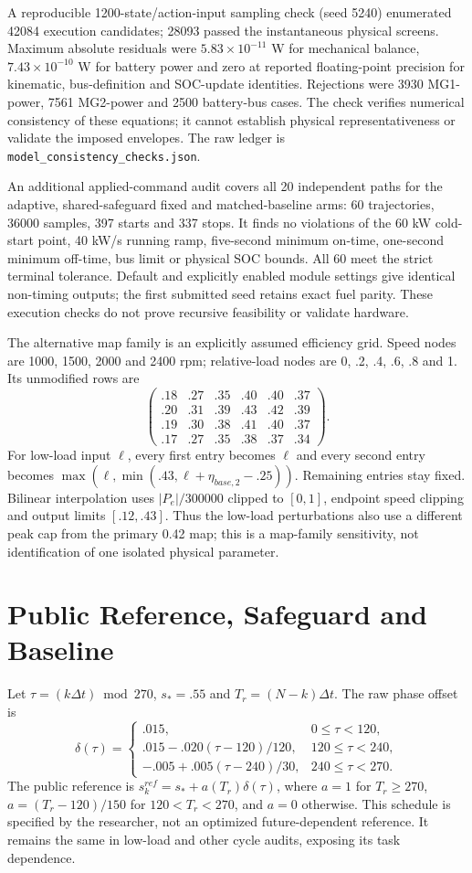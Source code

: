 \documentclass[11pt,a4paper]{article}
\begin{document}
A reproducible 1200-state/action-input sampling check (seed 5240) enumerated 42084 execution candidates; 28093 passed the instantaneous physical screens. Maximum absolute residuals were $5.83\times10^{-11}$ W for mechanical balance, $7.43\times10^{-10}$ W for battery power and zero at reported floating-point precision for kinematic, bus-definition and SOC-update identities. Rejections were 3930 MG1-power, 7561 MG2-power and 2500 battery-bus cases. The check verifies numerical consistency of these equations; it cannot establish physical representativeness or validate the imposed envelopes. The raw ledger is \texttt{model\_consistency\_checks.json}.

An additional applied-command audit covers all 20 independent paths for the adaptive, shared-safeguard fixed and matched-baseline arms: 60 trajectories, 36000 samples, 397 starts and 337 stops. It finds no violations of the 60 kW cold-start point, 40 kW/s running ramp, five-second minimum on-time, one-second minimum off-time, bus limit or physical SOC bounds. All 60 meet the strict terminal tolerance. Default and explicitly enabled module settings give identical non-timing outputs; the first submitted seed retains exact fuel parity. These execution checks do not prove recursive feasibility or validate hardware.

The alternative map family is an explicitly assumed efficiency grid. Speed nodes are 1000, 1500, 2000 and 2400 rpm; relative-load nodes are 0, .2, .4, .6, .8 and 1. Its unmodified rows are
\[
\begin{pmatrix}.18&.27&.35&.40&.40&.37\\.20&.31&.39&.43&.42&.39\\.19&.30&.38&.41&.40&.37\\.17&.27&.35&.38&.37&.34\end{pmatrix}.
\]
For low-load input $\ell$, every first entry becomes $\ell$ and every second entry becomes $\max(\ell,\min(.43,\ell+\eta_{base,2}-.25))$. Remaining entries stay fixed. Bilinear interpolation uses $|P_e|/300000$ clipped to $[0,1]$, endpoint speed clipping and output limits $[.12,.43]$. Thus the low-load perturbations also use a different peak cap from the primary 0.42 map; this is a map-family sensitivity, not identification of one isolated physical parameter.

\section{Public Reference, Safeguard and Baseline}
Let $\tau=(k\Delta t)\bmod270$, $s_*=.55$ and $T_r=(N-k)\Delta t$. The raw phase offset is
\[
\delta(\tau)=\begin{cases}.015,&0\leq\tau<120,\\.015-.020(\tau-120)/120,&120\leq\tau<240,\\-.005+.005(\tau-240)/30,&240\leq\tau<270.\end{cases}
\]
The public reference is $s_k^{ref}=s_*+a(T_r)\delta(\tau)$, where $a=1$ for $T_r\geq270$, $a=(T_r-120)/150$ for $120<T_r<270$, and $a=0$ otherwise. This schedule is specified by the researcher, not an optimized future-dependent reference. It remains the same in low-load and other cycle audits, exposing its task dependence.
\end{document}
